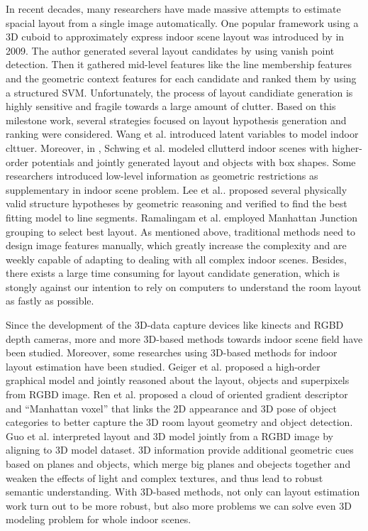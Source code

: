 In recent decades, many researchers have made massive attempts to estimate spacial layout from a single image automatically. One popular framework using a 3D cuboid to approximately express indoor scene layout was introduced by \cite{hedau2009recovering} in 2009. The author generated several layout candidates by using vanish point detection. Then it gathered mid-level features like the line membership features and the geometric context features for each candidate and ranked them by using a structured SVM. Unfortunately, the process of layout candidiate generation is highly sensitive and fragile towards a large amount of clutter. Based on this milestone work, several strategies focused on layout hypothesis generation and ranking were considered. Wang et al.\cite{wang2013discriminative} introduced latent variables to model indoor clttuer. Moreover, in \cite{schwing2012efficient}\cite{schwing2013box}, Schwing et al. modeled cllutterd indoor scenes with higher-order potentials and jointly generated layout and objects with box shapes. Some researchers introduced low-level information as geometric restrictions as supplementary in indoor scene problem. Lee et al.\cite{lee2009geometric}. proposed several physically valid structure hypotheses by geometric reasoning and verified to find the best fitting model to line segments. Ramalingam et al.\cite{ramalingam2013manhattan} employed Manhattan Junction grouping to select best layout. As mentioned above, traditional methods need to design image features manually, which greatly increase the complexity and are weekly capable of adapting to dealing with all complex indoor scenes. Besides, there exists a large time consuming for layout candidate generation, which is stongly against our intention to rely on computers to understand the room layout as fastly as possible.

Since the development of the 3D-data capture devices like kinects and RGBD depth cameras, more and more 3D-based methods towards indoor scene field have been studied. Moreover, some researches using 3D-based methods for indoor layout estimation have been studied. Geiger et al.\cite{geiger2015joint} proposed a high-order graphical model and jointly reasoned about the layout, objects and superpixels from RGBD image. Ren et al.\cite{ren2016three} proposed a cloud of oriented gradient descriptor and “Manhattan voxel” that links the 2D appearance and 3D pose of object categories to better capture the 3D room layout geometry and object detection. Guo et al.\cite{guo2015predicting} interpreted layout and 3D model jointly from a RGBD image by aligning to 3D model dataset. 3D information provide additional geometric cues based on planes and objects, which merge big planes and obejects together and weaken the effects of light and complex textures, and thus lead to robust semantic understanding. With 3D-based methods, not only can layout estimation work turn out to be more robust, but also more problems we can solve even 3D modeling  problem for whole indoor scenes.  

